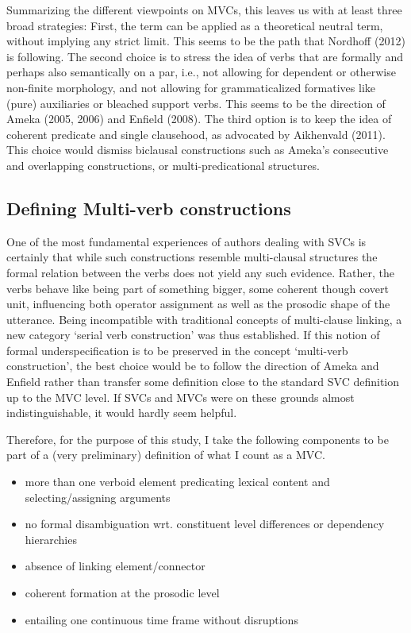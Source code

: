 Summarizing the different viewpoints on MVCs, this leaves us with at least three broad strategies: First, the term can be applied as a theoretical neutral term, without implying any strict limit. This seems to be the path that  Nordhoff (2012) is following. The second choice is to stress the idea of verbs that are formally and perhaps also semantically on a par, i.e., not allowing for dependent or otherwise non-finite morphology, and not allowing for grammaticalized formatives like (pure) auxiliaries or bleached support verbs. This seems to be the direction of Ameka (2005, 2006) and Enfield (2008). The third option is to keep the idea of coherent predicate and single clausehood, as advocated by Aikhenvald (2011). This choice would dismiss biclausal constructions such as Ameka's consecutive and overlapping constructions, or multi-predicational structures.

\subsection{Defining Multi-verb constructions}\label{sec:defining}

One of the most fundamental experiences of authors dealing with SVCs is certainly that while such constructions resemble multi-clausal structures the formal relation between the verbs does not yield any such evidence. Rather, the verbs behave like being part of something bigger, some coherent though covert unit, influencing both operator assignment as well as the prosodic shape of the utterance. Being incompatible with traditional concepts of multi-clause linking, a new category `serial verb construction' was thus established. If this notion of formal underspecification is to be preserved in the concept `multi-verb construction', the best choice would be to follow the direction of Ameka and Enfield rather than transfer some definition close to the standard SVC definition up to the MVC level. If SVCs and MVCs were on these grounds almost indistinguishable, it would hardly seem helpful.

Therefore, for the purpose of this study, I take the following components to be part of a (very preliminary) definition of what I count as a MVC.


\begin{itemize}
\item more than one verboid element predicating lexical content and selecting/assigning arguments
\item no formal disambiguation wrt. constituent level differences or dependency hierarchies
\item absence of linking element/connector
\item coherent formation at the prosodic level
\item entailing one continuous time frame without disruptions
\end{itemize} 

